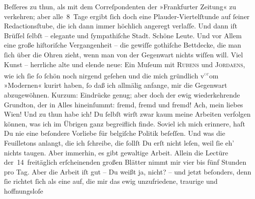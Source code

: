 \begin{ledgroupsized}[t]{13cm}
               Beſſeres zu thun, als mit dem Correſpondenten der »Frankfurter Zeitung« zu verkehren; aber alle 8 Tage ergibt ſich doch eine
               Plauder-Viertelſtunde auf ſeiner Redactionsſtube, die ich dann immer höchlich angeregt verlaſſe. Und dann iſt
                  Brüſſel ſelbſt – elegante und ſympathiſche Stadt. Schöne Leute. Und vor
               Allem eine große hiſtoriſche Vergangenheit – die gewiſſe gothiſche Bettdecke, die man
               ſich über die  Ohren zieht, wenn man von der
               Gegenwart nichts wiſſen will. {\pb}Viel Kunst –
               herrliche alte und elende neue: Ein Muſeum mit \textsc{Rubens} und \textsc{Jordaens}, wie ich ſie ſo ſchön noch nirgend geſehen und die mich gründlich v\substVorne{}\textsuperscript{\textcolor{gray}{or}}\substDazwischen{}om\substHinten{} »Modernen« kurirt haben, ſo daß ich allmälig anfange, mir die Gegenwart
               abzugewöhnen. Kurzum: Eindrücke genug; aber doch der ewig wiederkehrende Grundton,
               der in Alles hineinſummt: ſremd, fremd und fremd! Ach, mein liebes Wien! {\dotsfive}\pend
           \pstart
           Und zu thun habe ich! Du ſelbſt wirſt zwar kaum meine Arbeiten verfolgen können, was
               ich im Übrigen ganz begreiflich finde. Soviel ich mich erinnere, haſt Du nie eine
               beſondere Vorliebe für belgiſche Politik
               beſeſſen. Und was die Feuilletons anlangt, die ich ſchreibe, die ſollſt Du erſt nicht
               leſen, weil ſie eh’ nichts taugen. Aber immerhin, es gibt gewaltige Arbeit. Allein
               die Lectüre der 14 freitäglich erſcheinenden großen Blätter nimmt mir vier bis fünf
               Stunden pro Tag. Aber die Arbeit iſt gut – Du weißt ja, nicht? – und jetzt beſonders,
               denn ſie richtet ſich als eine \label{K_L02664-8v}\label{K_L02664-8h} auf, die mir das {\pb}ewig unzufriedene, traurige und hoffnungsloſe

\end{ledgroupsized}
